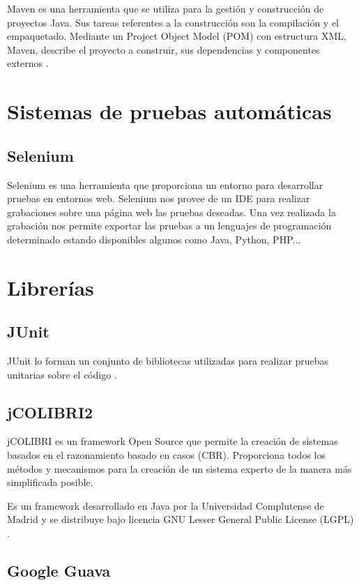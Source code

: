 Maven es una herramienta que se utiliza para la gestión y construcción de proyectos Java. Sus tareas referentes a la construcción son la compilación y el empaquetado. Mediante un Project Object Model (POM) con estructura XML, Maven, describe el proyecto a construir, sus dependencias y componentes externos \cite{maven:wiki}. 

\section{Sistemas de pruebas automáticas}

\subsection{Selenium}

Selenium es una herramienta que proporciona un entorno para desarrollar pruebas en entornos web. Selenium nos provee de un IDE para realizar grabaciones sobre una página web las pruebas deseadas. Una vez realizada la grabación nos permite exportar las pruebas a un lenguajes de programación determinado estando disponibles algunos como Java, Python, PHP... \cite{selenium:wiki}

\section{Librerías}

\subsection{JUnit}

JUnit lo forman un conjunto de bibliotecas utilizadas para realizar pruebas unitarias sobre el código \cite{junit:wiki}.

\subsection{jCOLIBRI2}

jCOLIBRI es un framework Open Source que permite la creación de sistemas basados en el razonamiento basado en casos (CBR). Proporciona todos los métodos y mecanismos para la creación de un sistema experto de la manera más simplificada posible.

Es un framework desarrollado en Java por la Universidad Complutense de Madrid y se distribuye bajo licencia GNU Lesser General Public License (LGPL) \cite{colibri:frame}.

\subsection{Google Guava}

